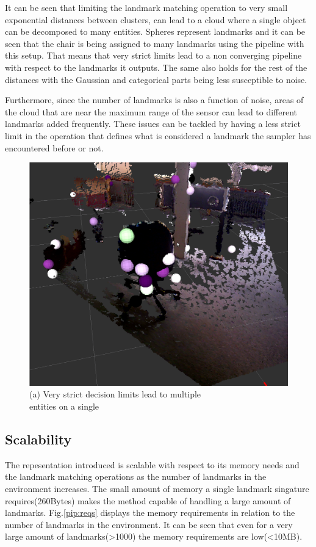 \documentclass[twoside,hidelinks]{article}
\begin{document}
It can be seen that limiting the landmark matching operation to very small exponential distances between clusters, can lead to a cloud where a single object can be decomposed to many entities. Spheres represent landmarks and it can be seen that the chair is being assigned to many landmarks using the pipeline with this setup. That means that very strict limits lead to a non converging pipeline with respect to the landmarks it outputs. The same also holds for the rest of the distances with the Gaussian and categorical parts being less susceptible to noise. 

Furthermore, since the number of landmarks is also a function of noise, areas of the cloud that are near the maximum range of the sensor can lead to different landmarks added frequently. These issues can be tackled by having a less strict limit in the operation that defines what is considered a landmark the sampler has encountered before or not.

\begin{figure}[!ht]
        \centering
	    \includegraphics[width=.5\textwidth]{monsterchair} \\
	  (a) Very strict decision limits lead to multiple \\
	   entities on a single \\[6pt]
	  \label{pip:expo}
\end{figure}

\subsection{Scalability}

The repesentation introduced is scalable with respect to its memory needs and the landmark matching operations as the number of landmarks in the environment increases.
The small amount of memory a single landmark singature requires(260Bytes) makes the method capable of handling a large amount of landmarks. Fig.\ref{pip:reqs} displays the memory requirements in relation to the number of landmarks in the environment. It can be seen that even for a very large amount of landmarks(>1000) the memory requirements are low(<10MB).
\end{document}
